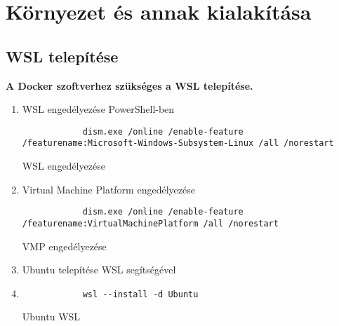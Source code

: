 ﻿\chapter{Környezet és annak kialakítása}

\section{WSL telepítése}
\begin{flushleft}
    \textbf{A Docker szoftverhez szükséges a WSL telepítése.}
\end{flushleft}
\begin{enumerate}
    \item WSL engedélyezése PowerShell-ben
    \begin{listing}[H]
        \begin{verbatim}
            dism.exe /online /enable-feature /featurename:Microsoft-Windows-Subsystem-Linux /all /norestart
        \end{verbatim}
        \caption{WSL engedélyezése}
        \label{code:wsl_ena}
    \end{listing}
    \item Virtual Machine Platform engedélyezése
    \begin{listing}[H]
        \begin{verbatim}
            dism.exe /online /enable-feature /featurename:VirtualMachinePlatform /all /norestart
        \end{verbatim}
        \caption{VMP engedélyezése}
        \label{code:vmp}
    \end{listing}
    \item Ubuntu telepítése WSL segítségével
    \item \begin{listing}[H]
        \begin{verbatim}
            wsl --install -d Ubuntu
        \end{verbatim}
        \caption{Ubuntu WSL}
        \label{code:ubuntu_wsl}
    \end{listing}
\end{enumerate}